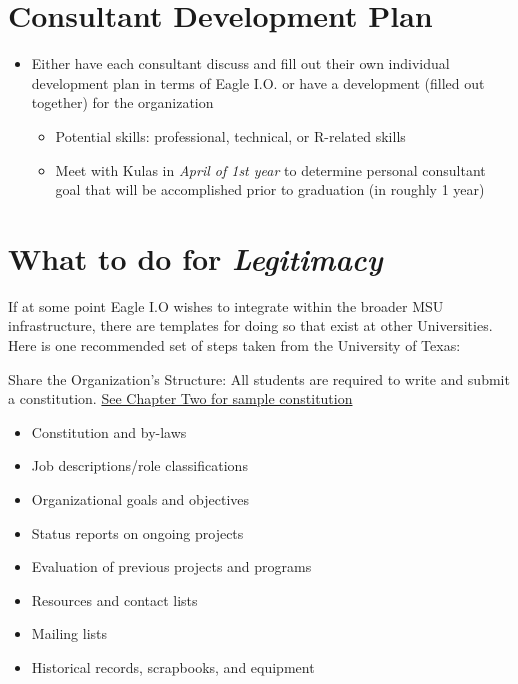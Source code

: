 \documentclass[
]{book}
\providecommand{\tightlist}{%
  \setlength{\itemsep}{0pt}\setlength{\parskip}{0pt}}
\begin{document}
\hypertarget{consultant-development-plan}{%
\section{Consultant Development Plan}\label{consultant-development-plan}}

\begin{itemize}
\tightlist
\item
  Either have each consultant discuss and fill out their own individual development plan in terms of Eagle I.O. or have a development (filled out together) for the organization

  \begin{itemize}
  \tightlist
  \item
    Potential skills: professional, technical, or R-related skills
  \item
    Meet with Kulas in \emph{April of 1st year} to determine personal consultant goal that will be accomplished prior to graduation (in roughly 1 year)
  \end{itemize}
\end{itemize}

\hypertarget{what-to-do-for-legitimacy}{%
\section{\texorpdfstring{What to do for \emph{Legitimacy}}{What to do for Legitimacy}}\label{what-to-do-for-legitimacy}}

If at some point Eagle I.O wishes to integrate within the broader MSU infrastructure, there are templates for doing so that exist at other Universities. Here is one recommended set of steps taken from the University of Texas:

Share the Organization's Structure: All students are required to write and submit a constitution. \href{https://www.utdallas.edu/soc/manual/04/\#leadership}{See Chapter Two for sample constitution}

\begin{itemize}
\tightlist
\item
  Constitution and by-laws
\item
  Job descriptions/role classifications
\item
  Organizational goals and objectives
\item
  Status reports on ongoing projects
\item
  Evaluation of previous projects and programs
\item
  Resources and contact lists
\item
  Mailing lists
\item
  Historical records, scrapbooks, and equipment
\end{itemize}
\end{document}
